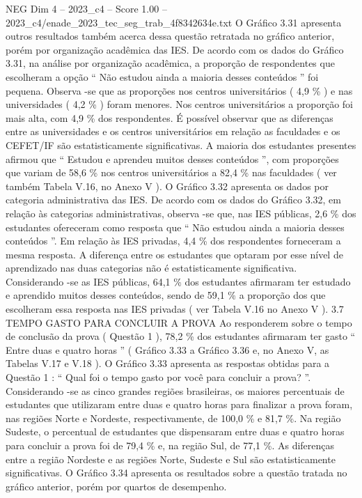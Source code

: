 \begin{textsample}{NEG Dim 4 – 2023\_c4 – Score 1.00 – 2023\_c4/enade\_2023\_tec\_seg\_trab\_4f8342634e.txt}
O Gráfico 3.31 apresenta outros resultados também acerca dessa questão retratada no gráfico anterior, porém por organização acadêmica das IES.
De acordo com os dados do Gráfico 3.31, na análise por organização acadêmica, a proporção de respondentes que escolheram a opção “ Não estudou ainda a maioria desses conteúdos ” foi pequena.
Observa -se que as proporções nos centros universitários ( 4,9 \% ) e nas universidades ( 4,2 \% ) foram menores.
Nos centros universitários a proporção foi mais alta, com 4,9 \% dos respondentes.
É possível observar que as diferenças entre as universidades e os centros universitários em relação as faculdades e os CEFET/IF são estatisticamente significativas.
A maioria dos estudantes presentes afirmou que “ Estudou e aprendeu muitos desses conteúdos ”, com proporções que variam de 58,6 \% nos centros universitários a 82,4 \% nas faculdades ( ver também Tabela V.16, no Anexo V ).
O Gráfico 3.32 apresenta os dados por categoria administrativa das IES.
De acordo com os dados do Gráfico 3.32, em relação às categorias administrativas, observa -se que, nas IES públicas, 2,6 \% dos estudantes ofereceram como resposta que “ Não estudou ainda a maioria desses conteúdos ”.
Em relação às IES privadas, 4,4 \% dos respondentes forneceram a mesma resposta.
A diferença entre os estudantes que optaram por esse nível de aprendizado nas duas categorias não é estatisticamente significativa.
Considerando -se as IES públicas, 64,1 \% dos estudantes afirmaram ter estudado e aprendido muitos desses conteúdos, sendo de 59,1 \% a proporção dos que escolheram essa resposta nas IES privadas ( ver Tabela V.16 no Anexo V ). 3.7 TEMPO GASTO PARA CONCLUIR A PROVA Ao responderem sobre o tempo de conclusão da prova ( Questão 1 ), 78,2 \% dos estudantes afirmaram ter gasto “ Entre duas e quatro horas ” ( Gráfico 3.33 a Gráfico 3.36 e, no Anexo V, as Tabelas V.17 e V.18 ).
O Gráfico 3.33 apresenta as respostas obtidas para a Questão 1 : “ Qual foi o tempo gasto por você para concluir a prova? ”.
Considerando -se as cinco grandes regiões brasileiras, os maiores percentuais de estudantes que utilizaram entre duas e quatro horas para finalizar a prova foram, nas regiões Norte e Nordeste, respectivamente, de 100,0 \% e 81,7 \%.
Na região Sudeste, o percentual de estudantes que dispensaram entre duas e quatro horas para concluir a prova foi de 79,4 \% e, na região Sul, de 77,1 \%.
As diferenças entre a região Nordeste e as regiões Norte, Sudeste e Sul são estatisticamente significativas.
O Gráfico 3.34 apresenta os resultados sobre a questão tratada no gráfico anterior, porém por quartos de desempenho.

\end{textsample}
